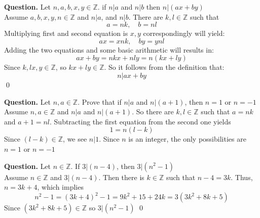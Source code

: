 \begin{example}{}
	\textbf{Question.} Let $ n,a,b,x,y \in \mathbb{Z} $. if $ n|a $ and $ n|b $ then $ n|(ax+by) $ \\
	
	Assume $ a,b,x,y,n \in \mathbb{Z} $ and $ n|a $, and $ n|b $. There are $ k,l \in \mathbb{Z} $ such that 
	\[ a = nk, \quad b = nl \]
	Multiplying first and second equation is $ x,y $ correspondingly will yield:
	\[ ax = xnk, \quad by = ynl \]
	Adding the two equations and some basic arithmetic will results in: 
	\[ax + by = nkx + nly = n(kx+ly)\]
	Since $ k,lx,y \in \mathbb{Z} $, so $ kx+ly \in \mathbb{Z} $. So it follows from the definition that:
	\[ n|ax + by \] 	\qed
\end{example}

\begin{example}{}
	\textbf{Question.} Let $ n,a \in \mathbb{Z} $. Prove that if $ n|a $ and $ n|(a+1) $, then $ n=1 $ or $ n=-1 $ \\
	
	 Assume $ n,a \in \mathbb{Z} $ and $ n|a $ and $ n|(a+1) $. So there are $ k,l \in \mathbb{Z} $ such that $ a=nk $ and $ a+1 = nl $. Subtracting the first equation from the second one yields
	\[ 1 = n(l-k) \]
	Since $ (l-k) \in \mathbb{Z} $, we see $ n|1 $. Since $ n $ is an integer, the only possibilities are $ n=1 $ or $ n=-1 $
\end{example}

\begin{example}{}
	\textbf{Question.} Let $ n \in \mathbb{Z} $. If $ 3|(n-4) $, then $ 3|(n^2-1) $ \\
	
	 Assume $ n \in \mathbb{Z} $ and $ 3|(n-4) $. Then there is $ k \in  \mathbb{Z} $ such that $ n-4 = 3k $. Thus, $ n=3k+4 $, which implies
	\[ n^2 - 1 = (3k+4)^2 - 1 = 9k^2 + 15 + 24k = 3 (3k^2 + 8k +5)  \]
	Since $ (3k^2 + 8k +5) \in \mathbb{Z} $ so $ 3|(n^2-1) $ \qed
\end{example}

